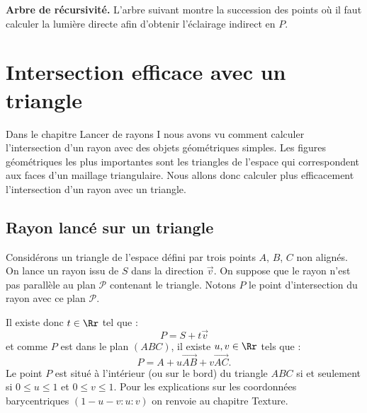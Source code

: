 \documentclass[11pt,class=report,crop=false]{standalone}
\begin{document}
\medskip

\textbf{Arbre de récursivité.}
L'arbre suivant montre la succession des points où il faut calculer la lumière directe afin d'obtenir l'éclairage indirect en $P$.



\section{Intersection efficace avec un triangle}

Dans le chapitre \og{}Lancer de rayons I\fg{} nous avons vu comment calculer l'intersection d'un rayon avec des objets géométriques simples. Les figures géométriques les plus importantes sont les triangles de l'espace qui correspondent aux faces d'un maillage triangulaire. Nous allons donc calculer plus efficacement l'intersection d'un rayon avec un triangle.


\subsection{Rayon lancé sur un triangle}


Considérons un triangle de l'espace défini par trois points $A$, $B$, $C$ non alignés.
On lance un rayon issu de $S$ dans la direction $\vec v$. On suppose que le rayon n'est pas parallèle au plan $\mathcal{P}$ contenant le triangle.
Notons $P$ le point d'intersection du rayon avec ce plan $\mathcal{P}$.


Il existe donc $t \in \Rr$ tel que :
$$P = S + t \vec v$$
et comme $P$ est dans le plan $(ABC)$, il existe $u,v \in \Rr$ tels que :
$$P = A + u \overrightarrow{AB} + v \overrightarrow{AC}.$$
Le point $P$ est situé à l'intérieur (ou sur le bord) du triangle $ABC$ si et seulement si $0 \le u \le 1$ et $0 \le v \le 1$.
Pour les explications sur les coordonnées barycentriques $(1-u-v:u:v)$ on renvoie au chapitre \og{}Texture\fg{}.


\end{document}
